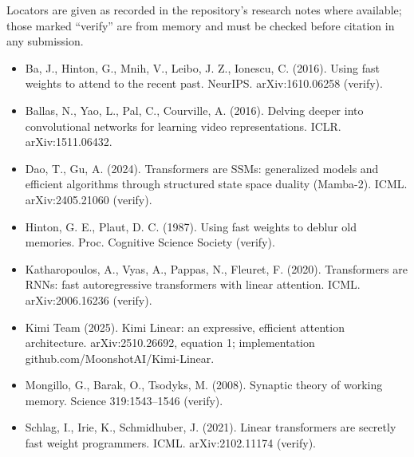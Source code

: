 \documentclass[

]{article}
\providecommand{\tightlist}{%

  \setlength{\itemsep}{0pt}\setlength{\parskip}{0pt}}
\begin{document}
Locators are given as recorded in the repository's research notes where available; those marked ``verify'' are from memory and must be checked before citation in any submission.



\begin{itemize}

\tightlist

\item

  Ba, J., Hinton, G., Mnih, V., Leibo, J. Z., Ionescu, C. (2016). Using fast weights to attend to the recent past. NeurIPS. arXiv:1610.06258 (verify).

\item

  Ballas, N., Yao, L., Pal, C., Courville, A. (2016). Delving deeper into convolutional networks for learning video representations. ICLR. arXiv:1511.06432.

\item

  Dao, T., Gu, A. (2024). Transformers are SSMs: generalized models and efficient algorithms through structured state space duality (Mamba-2). ICML. arXiv:2405.21060 (verify).

\item

  Hinton, G. E., Plaut, D. C. (1987). Using fast weights to deblur old memories. Proc. Cognitive Science Society (verify).

\item

  Katharopoulos, A., Vyas, A., Pappas, N., Fleuret, F. (2020). Transformers are RNNs: fast autoregressive transformers with linear attention. ICML. arXiv:2006.16236 (verify).

\item

  Kimi Team (2025). Kimi Linear: an expressive, efficient attention architecture. arXiv:2510.26692, equation 1; implementation github.com/MoonshotAI/Kimi-Linear.

\item

  Mongillo, G., Barak, O., Tsodyks, M. (2008). Synaptic theory of working memory. Science 319:1543--1546 (verify).

\item

  Schlag, I., Irie, K., Schmidhuber, J. (2021). Linear transformers are secretly fast weight programmers. ICML. arXiv:2102.11174 (verify).


\end{itemize}
\end{document}
